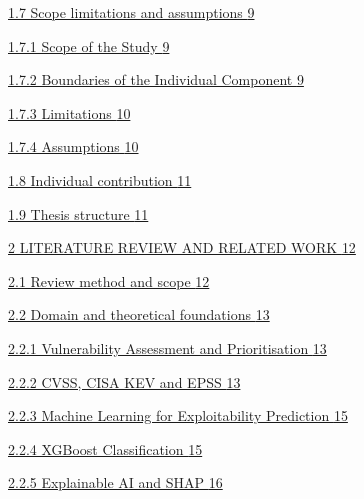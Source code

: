 \documentclass[
]{article}
\begin{document}
\protect\hyperlink{scope-limitations-and-assumptions}{1.7 Scope
limitations and assumptions
\protect\hyperlink{scope-limitations-and-assumptions}{9}}

\protect\hyperlink{scope-of-the-study}{1.7.1 Scope of the Study
\protect\hyperlink{scope-of-the-study}{9}}

\protect\hyperlink{boundaries-of-the-individual-component}{1.7.2
Boundaries of the Individual Component
\protect\hyperlink{boundaries-of-the-individual-component}{9}}

\protect\hyperlink{limitations}{1.7.3 Limitations
\protect\hyperlink{limitations}{10}}

\protect\hyperlink{assumptions}{1.7.4 Assumptions
\protect\hyperlink{assumptions}{10}}

\protect\hyperlink{individual-contribution}{1.8 Individual contribution
\protect\hyperlink{individual-contribution}{11}}

\protect\hyperlink{thesis-structure}{1.9 Thesis structure
\protect\hyperlink{thesis-structure}{11}}

\protect\hyperlink{literature-review-and-related-work}{2 LITERATURE
REVIEW AND RELATED WORK
\protect\hyperlink{literature-review-and-related-work}{12}}

\protect\hyperlink{review-method-and-scope}{2.1 Review method and scope
\protect\hyperlink{review-method-and-scope}{12}}

\protect\hyperlink{domain-and-theoretical-foundations}{2.2 Domain and
theoretical foundations
\protect\hyperlink{domain-and-theoretical-foundations}{13}}

\protect\hyperlink{vulnerability-assessment-and-prioritisation}{2.2.1
Vulnerability Assessment and Prioritisation
\protect\hyperlink{vulnerability-assessment-and-prioritisation}{13}}

\protect\hyperlink{cvss-cisa-kev-and-epss}{2.2.2 CVSS, CISA KEV and EPSS
\protect\hyperlink{cvss-cisa-kev-and-epss}{13}}

\protect\hyperlink{machine-learning-for-exploitability-prediction}{2.2.3
Machine Learning for Exploitability Prediction
\protect\hyperlink{machine-learning-for-exploitability-prediction}{15}}

\protect\hyperlink{xgboost-classification}{2.2.4 XGBoost Classification
\protect\hyperlink{xgboost-classification}{15}}

\protect\hyperlink{explainable-ai-and-shap}{2.2.5 Explainable AI and
SHAP \protect\hyperlink{explainable-ai-and-shap}{16}}
\end{document}
